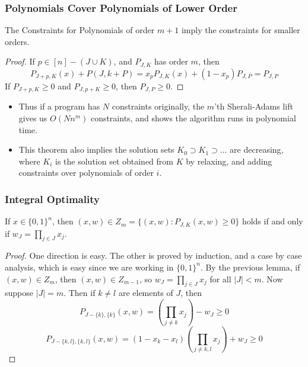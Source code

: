 \documentclass{beamer}
\begin{document}
\begin{frame}
    \frametitle{Polynomials Cover Polynomials of Lower Order}

    \begin{lemma}
        The Constraints for Polynomials of order $m+1$ imply the constraints for smaller orders.
    \end{lemma}
    \begin{proof}
        If $p \in [n] - (J \cup K)$, and $P_{J,K}$ has order $m$, then
        \[ P_{J + p,K}(x) + P(J, k + P) = x_p P_{J,K}(x) + (1 - x_p) P_{J, P} = P_{J,P} \]
        If $P_{J + p,K} \geq 0$ and $P_{J,p + K} \geq 0$, then $P_{J,P} \geq 0$.
    \end{proof}

    \begin{itemize}
        \item Thus if a program has $N$ constraints originally, the $m$'th Sherali-Adams lift gives us $O(Nn^m)$ constraints, and shows the algorithm runs in polynomial time.
        \item This theorem also implies the solution sets $K_0 \supset K_1 \supset \dots$ are decreasing, where $K_i$ is the solution set obtained from $K$ by relaxing, and adding constraints over polynomials of order $i$.
    \end{itemize}
\end{frame}

\begin{frame}
    \frametitle{Integral Optimality}

    \begin{lemma}
        If $x \in \{ 0, 1 \}^n$, then $(x,w) \in Z_m = \{ (x,w) : P_{J,K}(x,w) \geq 0 \}$ holds if and only if $w_J = \prod_{j \in J} x_j$.
    \end{lemma}
    \begin{proof}
        One direction is easy. The other is proved by induction, and a case by case analysis, which is easy since we are working in $\{ 0, 1 \}^n$. By the previous lemma, if $(x,w) \in Z_m$, then $(x,w) \in Z_{m-1}$, so $w_J = \prod_{j \in J} x_j$ for all $|J| < m$. Now suppose $|J| = m$. Then if $k \neq l$ are elements of $J$, then
    \[ P_{J - \{k \}, \{ k \}}(x,w) = \left( \prod_{j \neq k} x_j \right) - w_{J} \geq 0 \]
    \[ P_{J-\{k,l\}, \{k,l \}}(x,w) = (1 - x_k - x_l) \left( \prod_{j \neq k,l} x_j \right) + w_J \geq 0 \]
    \end{proof}
\end{frame}
\end{document}
